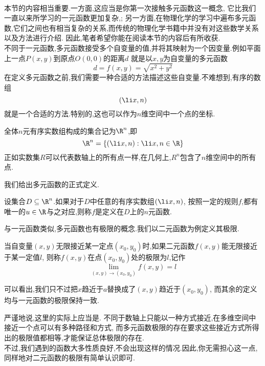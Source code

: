 \documentclass{ctexart}
\begin{document}
\pagestyle{plain}
\noindent{}\vspace{15pt}\\
\indent 本节的内容相当重要.一方面,这应当是你第一次接触多元函数这一概念,%
它比我们一直以来所学习的一元函数更加复杂,;%
另一方面,在物理化学的学习中遍布多元函数,它们之间也有相当复杂的关系,而传统的物理化学书籍中并没有对这些数学关系以及方法进行介绍.%
因此,笔者希望你能在阅读本节的内容后有所收获.\vspace{12pt}\\
\indent 不同于一元函数,多元函数接受多个自变量的值,并将其映射为一个因变量.例如平面上一点$P(x,y)$到原点$O(0,0)$的距离$d$%
就是以$x,y$为自变量的多元函数
\[d=f(x,y)=\sqrt{x^2+y^2}\]
在定义多元函数之前,我们需要一种合适的方法描述这些自变量.不难想到,有序的数组
\[\left(\li x,n\right)\]
就是一个合适的方法.特别的,这也可以作为$n$维空间中一个点的坐标.
\begin{definition}[0B.1.1 记号:$\R^n$]
    全体$n$元有序实数组构成的集合记为$\R^n$,即
    \[\R^n=\left\{\left(\li x,n\right):\li x,n\in\R\right\}\]
    正如实数集$R$可以代表数轴上的所有点一样,在几何上,$R^n$包含了$n$维空间中的所有点.
\end{definition}
我们给出多元函数的正式定义.
\begin{definition}[0B.1.2 多元函数]
    设集合$D\subseteq\R^n$.如果对于$D$中任意的有序实数组$\left(\li x,n\right)$,%
    按照一定的规则$f$,都有唯一的$u\in\R$与之对应,则称$f$是定义在$D$上的$n$元函数.
\end{definition}
\indent 与一元函数类似,多元函数也有极限的概念.我们以二元函数为例定义其极限.
\begin{definition}[0B.1.3 二元函数的极限]
    当自变量$(x,y)$无限接近某一定点$\left(x_0,y_0\right)$时,如果二元函数$f(x,y)$能无限接近于某一定值$l$,%
    则称$f(x,y)$在点$\left(x_0,y_0\right)$处的极限为$l$,记作
    \[\lim_{(x,y)\to\left(x_0,y_0\right)}f(x,y)=l\]

\end{definition}
可以看出,我们只不过把$x$趋近于$a$替换成了$(x,y)$趋近于$\left(x_0,y_0\right)$,%
而其余的定义均与一元函数的极限保持一致.
\begin{hint}
    严谨地说,这里的实际上应当是.%
    不同于数轴上只能以一种方式接近,在多维空间中接近一个点可以有多种路径和方式,%
    而多元函数极限的存在要求这些接近方式所得出的极限值都相等,才能保证总体极限的存在.\\
    不过,我们遇到的函数大多性质良好,不会出现这样的情况.因此,你无需担心这一点,%
    同样地对二元函数的极限有简单认识即可.
\end{hint}
\end{document}
